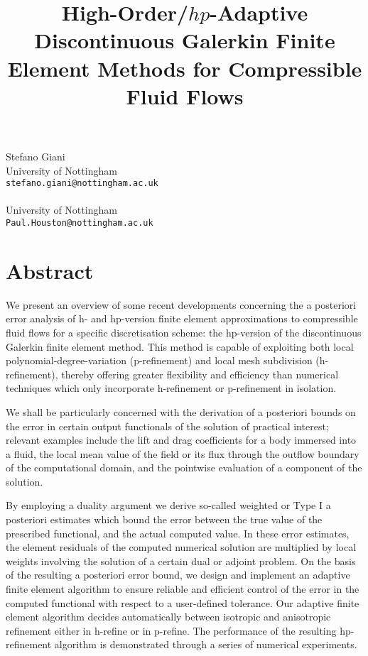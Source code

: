 \title{High-Order/$hp$-Adaptive Discontinuous Galerkin Finite Element Methods for Compressible Fluid Flows}
\author{}  \institute{}
\maketitle
\begin{center}
{\large Stefano Giani}\\
University of Nottingham\\
{\tt stefano.giani@nottingham.ac.uk}
\\ \vspace{4mm}{\large Paul Houston}\\
University of Nottingham\\
{\tt Paul.Houston@nottingham.ac.uk}

\end{center}

\section*{Abstract}

We present an overview of some recent developments concerning the a posteriori error analysis
of h- and hp-version finite element approximations to compressible fluid flows for a specific
discretisation scheme: the hp-version of the discontinuous Galerkin finite element method.
This method is capable of exploiting both local polynomial-degree-variation (p-refinement)
and local mesh subdivision (h-refinement), thereby offering greater flexibility and efficiency
than numerical techniques which only incorporate h-refinement or p-refinement in isolation.

We shall be particularly concerned with the derivation of a posteriori bounds on the error in
certain output functionals of the solution of practical interest; relevant examples include the lift
and drag coefficients for a body immersed into a fluid, the local mean value of the field or its
flux through the outflow boundary of the computational domain, and the pointwise evaluation
of a component of the solution.

By employing a duality argument we derive so-called weighted or Type I a posteriori estimates
which bound the error between the true value of the prescribed functional, and the actual computed value. In these error estimates, the element residuals of the computed numerical solution
are multiplied by local weights involving the solution of a certain dual or adjoint problem. On
the basis of the resulting a posteriori error bound, we design and implement an adaptive finite
element algorithm to ensure reliable and efficient control of the error in the computed functional with respect to a user-defined tolerance. Our adaptive finite element algorithm decides
automatically between isotropic and anisotropic refinement either in h-refine or in p-refine.
The performance of the resulting hp-refinement algorithm is demonstrated through a series of
numerical experiments.


